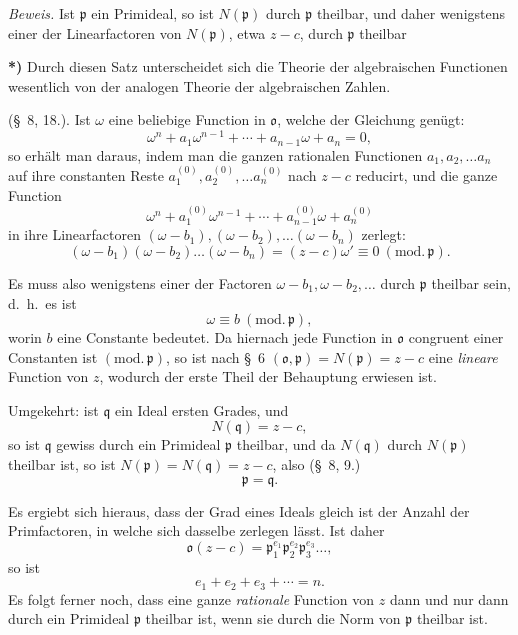 \documentclass{article}
\begin{document}
\emph{Beweis.} Ist $\mathfrak{p}$ ein Primideal, so ist $N(\mathfrak{p})$ durch $\mathfrak{p}$ theilbar, und daher wenigstens einer der Linearfactoren von $N(\mathfrak{p})$, etwa $z-c$, durch $\mathfrak{p}$ theilbar

\textbf{*)} Durch diesen Satz unterscheidet sich die Theorie der algebraischen Functionen wesentlich von der analogen Theorie der algebraischen Zahlen.

(§~8, 18.). Ist $\omega$ eine beliebige Function in $\mathfrak{o}$, welche der Gleichung genügt:
\[ \omega^{n} + a_{1}\omega^{n-1} + \cdots + a_{n-1}\omega + a_{n} = 0, \]
so erhält man daraus, indem man die ganzen rationalen Functionen $a_{1}, a_{2}, \ldots a_{n}$ auf ihre constanten Reste $a_{1}^{(0)}, a_{2}^{(0)}, \ldots a_{n}^{(0)}$ nach $z-c$ reducirt, und die ganze Function
\[ \omega^{n} + a_{1}^{(0)}\omega^{n-1} + \cdots + a_{n-1}^{(0)}\omega + a_{n}^{(0)} \]
in ihre Linearfactoren $(\omega-b_{1}), (\omega-b_{2}), \ldots (\omega-b_{n})$ zerlegt:
\[ (\omega-b_{1})(\omega-b_{2})\ldots(\omega-b_{n}) = (z-c)\omega' \equiv 0 \ (\text{mod.}\,\mathfrak{p}). \]

Es muss also wenigstens einer der Factoren $\omega-b_{1}, \omega-b_{2}, \ldots$ durch $\mathfrak{p}$ theilbar sein, d.\ h.\ es ist
\[ \omega \equiv b \ (\text{mod.}\,\mathfrak{p}), \]
worin $b$ eine Constante bedeutet. Da hiernach jede Function in $\mathfrak{o}$ congruent einer Constanten ist $(\text{mod.}\,\mathfrak{p})$, so ist nach §~6 $(\mathfrak{o}, \mathfrak{p}) = N(\mathfrak{p}) = z-c$ eine \emph{lineare} Function von $z$, wodurch der erste Theil der Behauptung erwiesen ist.

Umgekehrt: ist $\mathfrak{q}$ ein Ideal ersten Grades, und
\[ N(\mathfrak{q}) = z-c, \]
so ist $\mathfrak{q}$ gewiss durch ein Primideal $\mathfrak{p}$ theilbar, und da $N(\mathfrak{q})$ durch $N(\mathfrak{p})$ theilbar ist, so ist $N(\mathfrak{p}) = N(\mathfrak{q}) = z-c$, also (§~8, 9.)
\[ \mathfrak{p} = \mathfrak{q}. \]

Es ergiebt sich hieraus, dass der Grad eines Ideals gleich ist der Anzahl der Primfactoren, in welche sich dasselbe zerlegen lässt. Ist daher
\[ \mathfrak{o}(z-c) = \mathfrak{p}_{1}^{e_{1}}\mathfrak{p}_{2}^{e_{2}}\mathfrak{p}_{3}^{e_{3}}\ldots, \]
so ist
\[ e_{1} + e_{2} + e_{3} + \cdots = n. \]
Es folgt ferner noch, dass eine ganze \emph{rationale} Function von $z$ dann und nur dann durch ein Primideal $\mathfrak{p}$ theilbar ist, wenn sie durch die Norm von $\mathfrak{p}$ theilbar ist.
\end{document}

